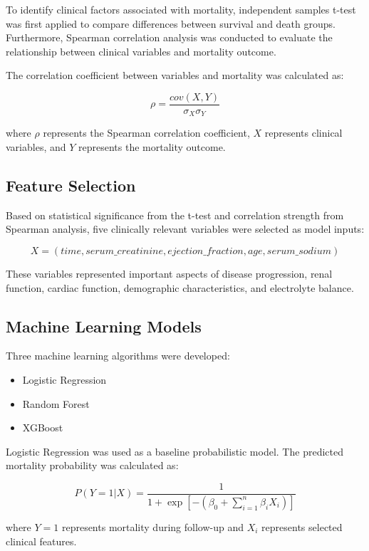 \documentclass[11pt]{article}
\begin{document}
To identify clinical factors associated with mortality, independent samples
t-test was first applied to compare differences between survival and death
groups. Furthermore, Spearman correlation analysis was conducted to evaluate the
relationship between clinical variables and mortality outcome.


The correlation coefficient between variables and mortality was calculated as:

\[
\rho =
\frac{cov(X,Y)}
{\sigma_X\sigma_Y}
\]

where $\rho$ represents the Spearman correlation coefficient, $X$ represents
clinical variables, and $Y$ represents the mortality outcome.


\subsection{Feature Selection}


Based on statistical significance from the t-test and correlation strength from
Spearman analysis, five clinically relevant variables were selected as model
inputs:

\[
X=
(time, serum\_creatinine,
ejection\_fraction,
age,
serum\_sodium)
\]


These variables represented important aspects of disease progression, renal
function, cardiac function, demographic characteristics, and electrolyte
balance.



\subsection{Machine Learning Models}


Three machine learning algorithms were developed:

\begin{itemize}
    \item Logistic Regression
    \item Random Forest
    \item XGBoost
\end{itemize}


Logistic Regression was used as a baseline probabilistic model. The predicted
mortality probability was calculated as:


\[
P(Y=1|X)=
\frac{1}
{1+\exp[-(\beta_0+\sum_{i=1}^{n}\beta_iX_i)]}
\]


where $Y=1$ represents mortality during follow-up and $X_i$ represents selected
clinical features.
\end{document}
